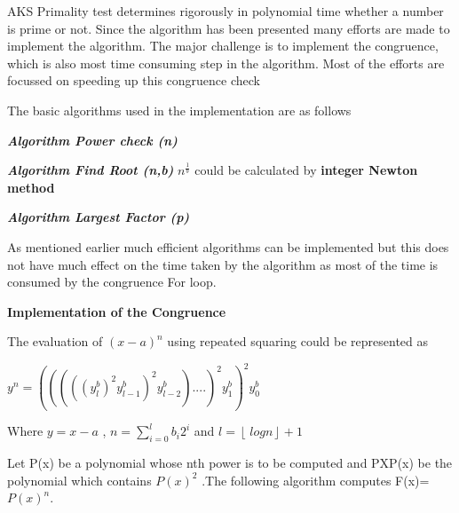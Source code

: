 \documentclass[a4paper,12pt]{article}
\begin{document}
AKS Primality test determines rigorously in polynomial time whether a number
is prime or not. Since the algorithm has been presented many efforts are made to
implement the algorithm. The major challenge is to implement the congruence, which is also most time consuming step in the algorithm. Most of the efforts are focussed on speeding up this congruence check

\begin{flushleft}
	The basic algorithms used in the implementation are as follows
\end{flushleft}
\begin{flushleft}
	\textbf{\textit{Algorithm Power check (n)}}
\end{flushleft}

\begin{flushleft}
	\textbf{\textit{Algorithm Find Root (n,b)}}
	\(n^{\frac{1}{b}}\) could be calculated by \textbf{integer Newton method}
\end{flushleft}

\begin{flushleft}
	\textbf{\textit{Algorithm Largest Factor (p)}}
\end{flushleft}

As mentioned earlier much efficient algorithms can be implemented but this does not have much effect on the time taken by the algorithm as most of the time is consumed by the congruence For loop.

\begin{flushleft}
	\textbf{Implementation of the Congruence}
\end{flushleft}

\begin{flushleft}
	The evaluation of \((x-a)^n\) using repeated squaring could be represented as
\end{flushleft}

\begin{center}
	\(y^n = (((((y^b_{l})^2y^b_{l-1})^2y^b_{l-2})....)^2y^b_{1})^2y^b_{0}\)
\end{center}

\begin{center}
	Where \(y=x-a\) , \(n=\sum_{i=0}^{l}b_{i}2^i\) and \(l = \left\lfloor\ logn \right\rfloor +1 \)
\end{center}

\begin{flushleft}
	Let P(x) be a polynomial whose nth power is to be computed and PXP(x) be the
polynomial which contains \(P(x)^2\)  .The following algorithm computes F(x)=\(P(x)^n\).
\end{flushleft}
\end{document}
